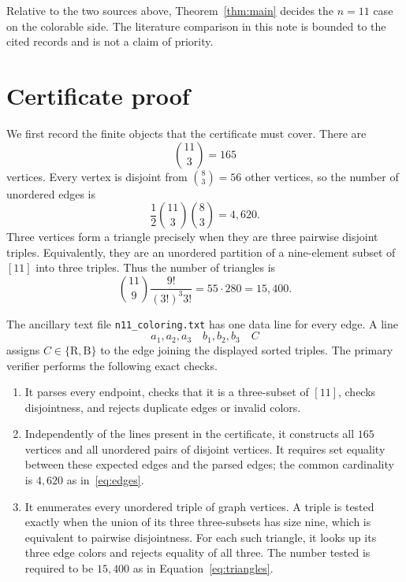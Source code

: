 \documentclass[11pt]{article}
\begin{document}
Relative to the two sources above, Theorem~\ref{thm:main} decides the
$n=11$ case on the colorable side.  The literature comparison in this note
is bounded to the cited records and is not a claim of priority.

\section{Certificate proof}

We first record the finite objects that the certificate must cover.  There
are
\[
  \binom{11}{3}=165
\]
vertices.  Every vertex is disjoint from $\binom{8}{3}=56$ other vertices,
so the number of unordered edges is
\begin{equation}\label{eq:edges}
  \frac12\binom{11}{3}\binom{8}{3}=4{,}620.
\end{equation}
Three vertices form a triangle precisely when they are three pairwise
disjoint triples.  Equivalently, they are an unordered partition of a
nine-element subset of $[11]$ into three triples.  Thus the number of
triangles is
\begin{equation}\label{eq:triangles}
  \binom{11}{9}\frac{9!}{{(3!)}^3 3!}
  =55\cdot 280=15{,}400.
\end{equation}

The ancillary text file \verb|n11_coloring.txt| has one data line for every
edge.  A line
\[
  a_1,a_2,a_3\quad b_1,b_2,b_3\quad C
\]
assigns $C\in\{\mathrm{R},\mathrm{B}\}$ to the edge joining the displayed
sorted triples.  The primary verifier performs the following exact checks.

\begin{enumerate}
  \item It parses every endpoint, checks that it is a three-subset of
  $[11]$, checks disjointness, and rejects duplicate edges or invalid
  colors.
  \item Independently of the lines present in the certificate, it constructs
  all $165$ vertices and all unordered pairs of disjoint vertices.  It
  requires set equality between these expected edges and the parsed edges;
  the common cardinality is $4{,}620$ as in~\eqref{eq:edges}.
  \item It enumerates every unordered triple of graph vertices.  A triple is
  tested exactly when the union of its three three-subsets has size nine,
  which is equivalent to pairwise disjointness.  For each such triangle, it
  looks up its three edge colors and rejects equality of all three.  The
  number tested is required to be $15{,}400$ as in
  Equation~\eqref{eq:triangles}.
\end{enumerate}
\end{document}
